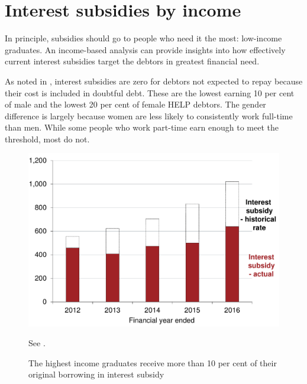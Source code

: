 \documentclass[embargoed]{grattan}
\begin{document}
\section{Interest subsidies by income}\label{sec:interest-subsidies-by-income}

In principle, subsidies should go to people who need it the most: low-income graduates.
An income-based analysis can provide insights into how effectively current interest subsidies target the debtors in greatest financial need.

As noted in , interest subsidies are zero for debtors not expected to repay because their cost is included in doubtful debt.
These are the lowest earning 10 per cent of male and the lowest 20 per cent of female \gls{HELP} debtors.
The gender difference is largely because women are less likely to consistently work full-time than men.
While some people who work part-time earn enough to meet the threshold, most do not.

\begin{figure}
\caption{The highest income graduates receive more than 10 per cent of their original borrowing in interest subsidy}\label{fig:fig10-highest-income-grads-receive-over-10pc-original-borrowing-interest-subsidy}

\includegraphics[page=10]{atlas/Chartpack.pdf}

%
{{See .}}
\end{figure}
\end{document}
